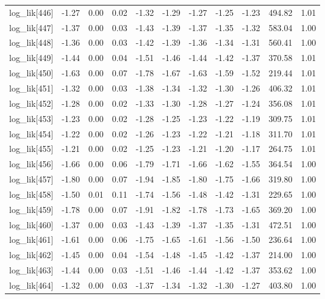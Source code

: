 \begin{table}[ht]
\begin{tabular}{rrrrrrrrrrr}
  log\_lik[446] & -1.27 & 0.00 & 0.02 & -1.32 & -1.29 & -1.27 & -1.25 & -1.23 & 494.82 & 1.01 \\ 
  log\_lik[447] & -1.37 & 0.00 & 0.03 & -1.43 & -1.39 & -1.37 & -1.35 & -1.32 & 583.04 & 1.00 \\ 
  log\_lik[448] & -1.36 & 0.00 & 0.03 & -1.42 & -1.39 & -1.36 & -1.34 & -1.31 & 560.41 & 1.00 \\ 
  log\_lik[449] & -1.44 & 0.00 & 0.04 & -1.51 & -1.46 & -1.44 & -1.42 & -1.37 & 370.58 & 1.01 \\ 
  log\_lik[450] & -1.63 & 0.00 & 0.07 & -1.78 & -1.67 & -1.63 & -1.59 & -1.52 & 219.44 & 1.01 \\ 
  log\_lik[451] & -1.32 & 0.00 & 0.03 & -1.38 & -1.34 & -1.32 & -1.30 & -1.26 & 406.32 & 1.01 \\ 
  log\_lik[452] & -1.28 & 0.00 & 0.02 & -1.33 & -1.30 & -1.28 & -1.27 & -1.24 & 356.08 & 1.01 \\ 
  log\_lik[453] & -1.23 & 0.00 & 0.02 & -1.28 & -1.25 & -1.23 & -1.22 & -1.19 & 309.75 & 1.01 \\ 
  log\_lik[454] & -1.22 & 0.00 & 0.02 & -1.26 & -1.23 & -1.22 & -1.21 & -1.18 & 311.70 & 1.01 \\ 
  log\_lik[455] & -1.21 & 0.00 & 0.02 & -1.25 & -1.23 & -1.21 & -1.20 & -1.17 & 264.75 & 1.01 \\ 
  log\_lik[456] & -1.66 & 0.00 & 0.06 & -1.79 & -1.71 & -1.66 & -1.62 & -1.55 & 364.54 & 1.00 \\ 
  log\_lik[457] & -1.80 & 0.00 & 0.07 & -1.94 & -1.85 & -1.80 & -1.75 & -1.66 & 319.80 & 1.00 \\ 
  log\_lik[458] & -1.50 & 0.01 & 0.11 & -1.74 & -1.56 & -1.48 & -1.42 & -1.31 & 229.65 & 1.00 \\ 
  log\_lik[459] & -1.78 & 0.00 & 0.07 & -1.91 & -1.82 & -1.78 & -1.73 & -1.65 & 369.20 & 1.00 \\ 
  log\_lik[460] & -1.37 & 0.00 & 0.03 & -1.43 & -1.39 & -1.37 & -1.35 & -1.31 & 472.51 & 1.00 \\ 
  log\_lik[461] & -1.61 & 0.00 & 0.06 & -1.75 & -1.65 & -1.61 & -1.56 & -1.50 & 236.64 & 1.00 \\ 
  log\_lik[462] & -1.45 & 0.00 & 0.04 & -1.54 & -1.48 & -1.45 & -1.42 & -1.37 & 214.00 & 1.00 \\ 
  log\_lik[463] & -1.44 & 0.00 & 0.03 & -1.51 & -1.46 & -1.44 & -1.42 & -1.37 & 353.62 & 1.00 \\ 
  log\_lik[464] & -1.32 & 0.00 & 0.03 & -1.37 & -1.34 & -1.32 & -1.30 & -1.27 & 403.80 & 1.00 \\ 

\end{tabular}
\end{table}
